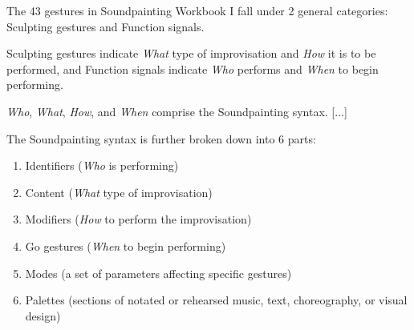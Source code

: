     \begin{smallquote}
        The 43 gestures in Soundpainting Workbook I fall under 2 general categories: Sculpting gestures and Function signals.

        \vspace{7pt}
        
        \noindent Sculpting gestures indicate \textit{What} type of improvisation and \textit{How} it is to be performed, and Function signals indicate \textit{Who} performs and \textit{When} to begin performing.

        \vspace{7pt}
    
        \noindent \textit{Who}, \textit{What}, \textit{How}, and \textit{When} comprise the Soundpainting syntax. [...] 

        \vspace{7pt}
        
        \noindent The Soundpainting syntax is further broken down into 6 parts:
            \begin{enumerate}
                \item Identifiers (\textit{Who} is performing)
                \item Content (\textit{What} type of improvisation)
                \item Modifiers (\textit{How} to perform the improvisation)
                \item Go gestures (\textit{When} to begin performing)
                \item Modes (a set of parameters affecting specific gestures)
                \item Palettes (sections of notated or rehearsed music, text, choreography, or visual design)\autocite[4]{Thompson_2006_1}
            \end{enumerate}
    \end{smallquote}

